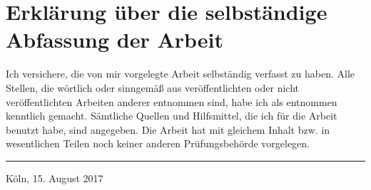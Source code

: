 \chapter*{Erklärung über die selbständige Abfassung der Arbeit}
Ich versichere, die von mir vorgelegte Arbeit selbständig verfasst zu haben. Alle Stellen, die wörtlich oder sinngemäß
aus veröffentlichten oder nicht veröffentlichten Arbeiten anderer entnommen sind, habe ich als entnommen kenntlich
gemacht. Sämtliche Quellen und Hilfsmittel, die ich für die Arbeit benutzt habe, sind angegeben. Die Arbeit hat mit
gleichem Inhalt bzw. in wesentlichen Teilen noch keiner anderen Prüfungsbehörde vorgelegen.

\vspace{20mm}
\hrule width7cm
\vspace{5mm}
Köln, 15. August 2017
